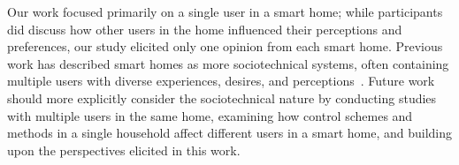 Our work focused primarily on a single user in a smart home; while participants did discuss how other users in the home influenced their perceptions and preferences, our study elicited only one opinion from each smart home. Previous work has described smart homes as more sociotechnical systems, often containing multiple users with diverse experiences, desires, and perceptions~\cite{geeng2019s}. Future work should more explicitly consider the sociotechnical nature by conducting studies with multiple users in the same home, examining how control schemes and methods in a single household affect different users in a smart home, and building upon the perspectives elicited in this work. 

